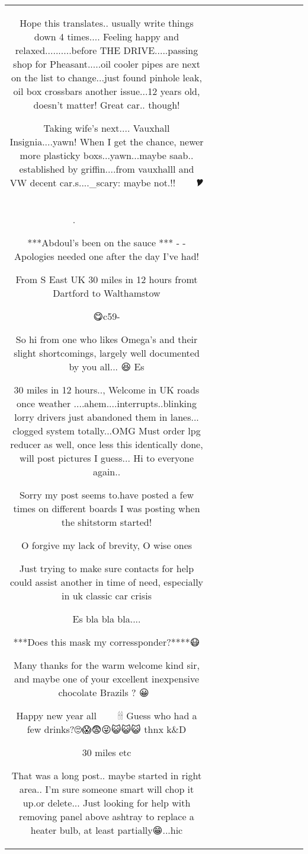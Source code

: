 \begin{table}[h!]
\begin{tabular}{|c|c|c|c|c|c|c|c|c|c|c|}
Hope this translates.. usually write things down 4 times.... Feeling happy and relaxed..........before THE DRIVE.....passing shop for Pheasant.....oil cooler pipes are next on the list to change...just found pinhole leak, oil box crossbars another issue...12 years old, doesn't matter! Great car.. though! 

Taking wife's next.... Vauxhall Insignia....yawn! When I get the chance, newer more plasticky boxs...yawn...maybe saab..     established by griffin....from vauxhalll and VW decent car.s...._scary: maybe not.!!🎅🎅🎄🎄🎄🎁🎁🎉🎔🎄🎄🎄🎄🎄🎄🎆



 . 🤪😱😈😈 🤒🤒🦑🦑🦆🦆👹👹💀💀🐔🐔🐔🐔 🍾🍾🍾


***Abdoul's been on the sauce  *** - - Apologies needed one after the day I've had! 

From S East UK
30 miles in 12 hours fromt Dartford to Walthamstow

😋c59-


So hi from one who likes Omega's and their slight shortcomings, largely well documented by you all...
😆
Es

30 miles in 12 hours.., Welcome in UK roads once weather ....ahem....interrupts..blinking lorry drivers just abandoned them in lanes... clogged system totally...OMG
Must order lpg reducer as well, once less this identically done, will post pictures I guess...
Hi to everyone again..



Sorry my post seems to.have posted a few times on different boards I was posting when the shitstorm started! 

O forgive my lack of brevity, O wise ones 

Just trying to make sure contacts for help could assist another in time of need, especially in uk classic car crisis 

Es bla bla bla....

***Does this mask my corressponder?****😷

Many thanks for the warm welcome kind sir, and maybe one of your excellent inexpensive chocolate Brazils ? 😀 🎅
 
Happy new year all🎇🎇🎃🥑😱🎂👻🎄🕯🕯
Guess who had a few drinks?🙄😱😨😜😺😺😺 thnx k\&D

30 miles etc



That was a long post.. maybe started in right area.. I'm sure someone smart will chop it up.or delete...
Just looking for help with removing panel above ashtray to replace a heater bulb, at least partially😁...hic


\end{tabular}
\end{table}
